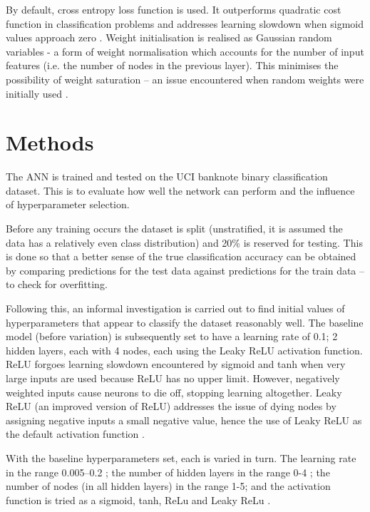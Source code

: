 \documentclass[12pt]{article}
\begin{document}
By default, cross entropy loss function is used. It outperforms
quadratic cost function in classification problems and addresses
learning slowdown when sigmoid values approach zero \cite{Nielsen}
\cite{Xavier}. Weight initialisation is realised as Gaussian random
variables - a form of weight normalisation which accounts for the number
of input features (i.e. the number of nodes in the previous layer). This
minimises the possibility of weight saturation -- an issue
encountered when random weights were initially used \cite{Nielsen}.

\vspace{-1.5em}
\section{Methods}
\vspace{-1.5em}

The ANN is trained and tested on the UCI banknote binary
classification dataset. This is to evaluate how well the network can
perform and the influence of hyperparameter selection.

Before any training occurs the dataset is split (unstratified, it is
assumed the data has a relatively even class distribution) and 20\%
is reserved for testing. This is done so that a better sense of the
true classification accuracy can be obtained by comparing predictions
for the test data against predictions for the train data -- to check for
overfitting.

Following this, an informal investigation is carried out to find initial
values of hyperparameters that appear to classify the dataset reasonably
well. The baseline model (before variation) is subsequently set to
have a learning rate of 0.1; 2 hidden layers, each with 4 nodes,
each using the Leaky ReLU activation function. ReLU forgoes learning
slowdown encountered by sigmoid and tanh when very large inputs are used
because ReLU has no upper limit. However, negatively weighted inputs cause
neurons to die off, stopping learning altogether. Leaky ReLU (an improved version of ReLU) addresses the issue of dying nodes by assigning negative inputs a small negative value, hence the use of Leaky ReLU as the default activation function \cite{Niwa}.

With the baseline hyperparameters set, each is varied in turn. The
learning rate in the range 0.005--0.2 \cite{Nielsen}; the number of hidden layers in
the range 0-4 \cite{Xavier}; the number of nodes (in all hidden layers) in the range
1-5; and the activation function is tried as a sigmoid, tanh, ReLu and
Leaky ReLu \cite{Niwa}.
\end{document}
